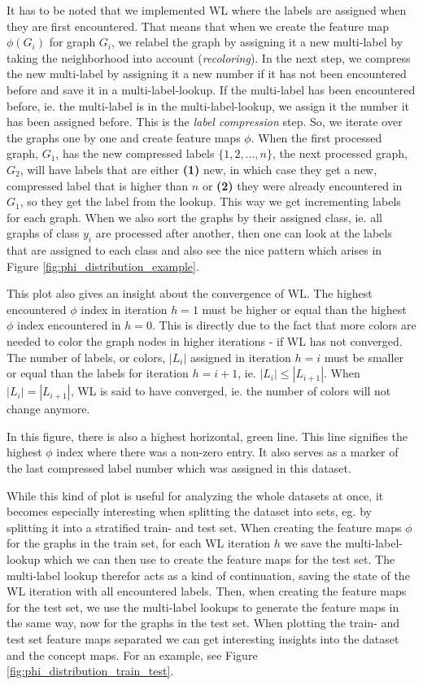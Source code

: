 It has to be noted that we implemented WL where the labels are assigned when they are first encountered. That means that when we create the feature map $\phi(G_i)$ for graph $G_i$, we relabel the graph by assigning it a new multi-label by taking the neighborhood into account (\textit{recoloring}). In the next step, we compress the new multi-label by assigning it a new number if it has not been encountered before and save it in a multi-label-lookup. If the multi-label has been encountered before, ie. the multi-label is in the multi-label-lookup, we assign it the number it has been assigned before.
This is the \textit{label compression} step.
So, we iterate over the graphs one by one and create feature maps $\phi$.
When the first processed graph, $G_1$, has the new compressed labels $\{1, 2, \ldots, n\}$, the next processed graph, $G_2$, will have labels that are either \textbf{(1)} new, in which case they get a new, compressed label that is higher than $n$ or \textbf{(2)} they were already encountered in $G_1$, so they get the label from the lookup.
This way we get incrementing labels for each graph.
When we also sort the graphs by their assigned class, ie. all graphs of class $y_i$ are processed after another, then one can look at the labels that are assigned to each class and also see the nice pattern which arises in Figure \ref{fig:phi_distribution_example}.

This plot also gives an insight about the convergence of WL.
The highest encountered $\phi$ index in iteration $h=1$ must be higher or equal than the highest $\phi$ index encountered in $h=0$.
This is directly due to the fact that more colors are needed to color the graph nodes in higher iterations - if WL has not converged.
The number of labels, or colors, $|L_i|$ assigned in iteration $h=i$ must be smaller or equal than the labels for iteration $h=i+1$, ie. $|L_i| \leq |L_{i + 1}|$.
When $|L_i| = |L_{i + 1}|$, WL is said to have converged, ie. the number of colors will not change anymore.

In this figure, there is also a highest horizontal, green line.
This line signifies the highest $\phi$ index where there was a non-zero entry.
It also serves as a marker of the last compressed label number which was assigned in this dataset.

While this kind of plot is useful for analyzing the whole datasets at once, it becomes especially interesting when splitting the dataset into sets, eg. by splitting it into a stratified train- and test set.
When creating the feature maps $\phi$ for the graphs in the train set, for each WL iteration $h$ we save the multi-label-lookup which we can then use to create the feature maps for the test set.
The multi-label lookup therefor acts as a kind of continuation, saving the state of the WL iteration with all encountered labels.
Then, when creating the feature maps for the test set, we use the multi-label lookups to generate the feature maps in the same way, now for the graphs in the test set.
When plotting the train- and test set feature maps separated we can get interesting insights into the dataset and the concept maps.
For an example, see Figure \ref{fig:phi_distribution_train_test}.

